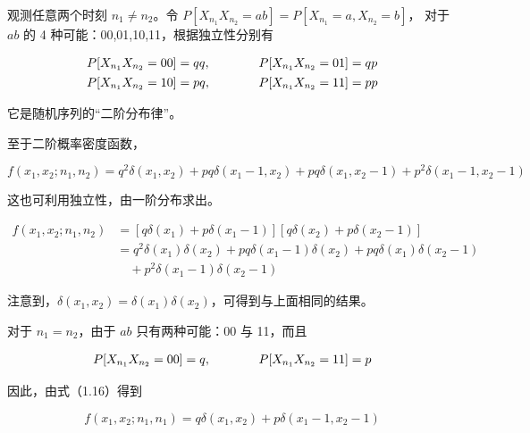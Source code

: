 \documentclass[11pt,openany,UTF8]{ctexbook}
\begin{document}
观测任意两个时刻 $n_1\ne n_2$\nobreak。令 $P[X_{n_1}X_{n_2}=ab]=P[X_{n_1}=a,X_{n_2}=b]$\nobreak，
对于 $ab$ 的 4 种可能\nobreak：00,01,10,11\nobreak，根据独立性分别有

\[
\begin{array}{@{}l@{\hspace{4em}}l@{}}
P[X_{n_1}X_{n_2}=00]=qq, & P[X_{n_1}X_{n_2}=01]=qp\\[4pt]
P[X_{n_1}X_{n_2}=10]=pq, & P[X_{n_1}X_{n_2}=11]=pp
\end{array}
\]

它是随机序列的“二阶分布律”\nobreak。

至于二阶概率密度函数\nobreak，

\[
f(x_1,x_2;n_1,n_2) = q^2\delta(x_1,x_2) + pq\delta(x_1-1,x_2)
  + pq\delta(x_1,x_2-1) + p^2\delta(x_1-1,x_2-1)
\]

这也可利用独立性\nobreak，由一阶分布求出\nobreak。

\[
\begin{aligned}
f(x_1,x_2;n_1,n_2) &= [q\delta(x_1)+p\delta(x_1-1)][q\delta(x_2)+p\delta(x_2-1)]\\
&= q^2\delta(x_1)\delta(x_2) + pq\delta(x_1-1)\delta(x_2)
  + pq\delta(x_1)\delta(x_2-1)\\
&\quad + p^2\delta(x_1-1)\delta(x_2-1)
\end{aligned}
\]

注意到\nobreak，$\delta(x_1,x_2)=\delta(x_1)\delta(x_2)$\nobreak，可得到与上面相同的结果\nobreak。

对于 $n_1=n_2$\nobreak，由于 $ab$ 只有两种可能\nobreak：00 与 11\nobreak，而且

\[
\begin{array}{@{}l@{\hspace{4em}}l@{}}
P[X_{n_1}X_{n_2}=00]=q, & P[X_{n_1}X_{n_2}=11]=p
\end{array}
\]

因此\nobreak，由式（1.16\nobreak）得到%

\[
f(x_1,x_2;n_1,n_1) = q\delta(x_1,x_2)+p\delta(x_1-1,x_2-1)
\]
\end{document}
